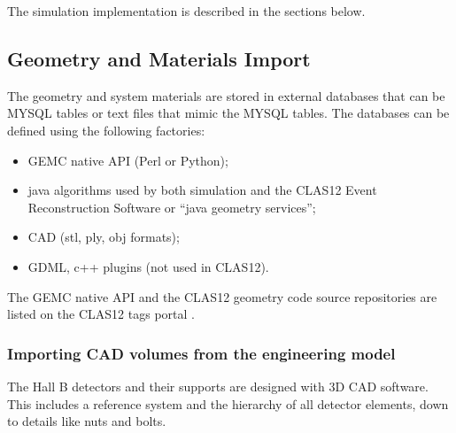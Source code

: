 The simulation implementation is described in the sections below.

\subsection{Geometry and Materials Import}

The geometry and system materials are stored in external databases that can be MYSQL tables or text files that mimic the MYSQL tables.
The databases can be defined using the following factories:

\begin{itemize}
	\item GEMC native API (Perl or Python);
	\item java algorithms used by both simulation and the CLAS12 Event Reconstruction Software \cite{recon-nim} or ``java geometry services'';
	\item CAD (stl, ply, obj formats);
	\item GDML, c++ plugins (not used in CLAS12).
\end{itemize}

The GEMC native API and the CLAS12 geometry code source repositories are listed on the CLAS12 tags portal \cite{clas12Tags}.


\subsubsection{Importing CAD volumes from the engineering model}

The Hall B detectors and their supports are designed with 3D CAD software. This includes a reference system and the
hierarchy of all detector elements, down to details like nuts and bolts.

